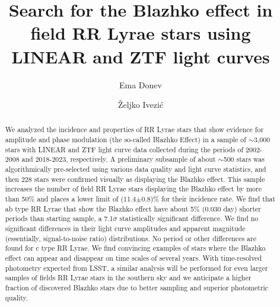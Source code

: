 \documentclass[twocolumn, linenumbers, tighten]{aastex631}
\begin{document}
\title{Search for the Blazhko effect in field RR Lyrae stars using LINEAR and ZTF light curves}

\author{Ema Donev}

\author[0000-0001-5250-2633]{\v{Z}eljko Ivezi\'{c}}



\begin{abstract}
We analyzed the incidence and properties of RR Lyrae stars that show evidence for amplitude and
phase modulation (the so-called Blazhko Effect) in a sample of $\sim$3,000 stars with LINEAR and ZTF light
curve data collected during the periods of 2002-2008 and 2018-2023, respectively. A preliminary subsample
of about $\sim$500 stars was algorithmically pre-selected using various data quality and light curve statistics,
and then 228 stars were confirmed visually as displaying the Blazhko effect. This sample increases the number
of field RR Lyrae stars displaying the Blazhko effect by more than 50\% and places a lower
limit of (11.4$\pm$0.8)\% for their incidence rate. We find that ab type RR Lyrae that show the Blazhko effect have
about 5\% (0.030 day) shorter periods than starting sample, a 7.1$\sigma$ statistically significant
difference. We find no significant differences in their light curve amplitudes and apparent magnitude (essentially,
signal-to-noise ratio) distributions. No period or other differences are found for c type RR Lyrae. We find convincing
examples of stars where the Blazhko effect can appear and disappear on time scales of several years.  With
time-resolved photometry expected from LSST, a similar analysis will be performed for even larger samples of fields
RR Lyrae stars in the southern sky and we anticipate a higher fraction of discovered Blazhko stars due to better
sampling and superior photometric quality.
\end{abstract}
 





\end{document}
